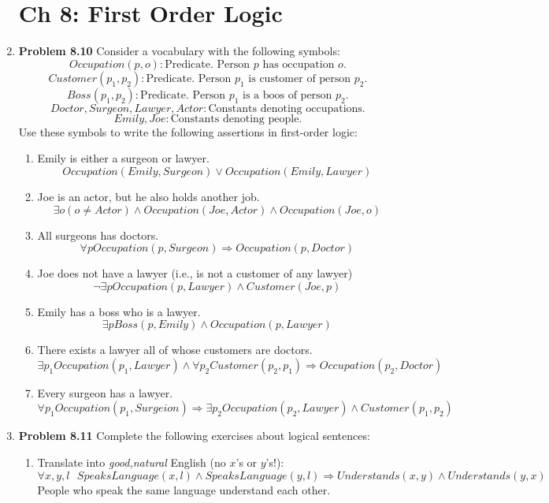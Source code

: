 \documentclass[10pt]{article}
\begin{document}
\begin{enumerate}
\section*{Ch 8: First Order Logic}
\item \textbf{Problem 8.10} Consider a vocabulary with the following symbols:
  \[Occupation(p,o): \textrm{Predicate. Person } p \textrm{ has occupation } o. \] 
  \[Customer(p_1,p_2): \textrm{Predicate. Person } p_1 \textrm{ is customer of person } p_2. \]
  \[Boss(p_1,p_2): \textrm{Predicate. Person } p_1 \textrm{ is a boos of person } p_2. \]
  \[Doctor, Surgeon, Lawyer, Actor: \textrm{Constants denoting occupations.} \]
  \[Emily, Joe: \textrm{Constants denoting people.} \]
  Use these symbols to write the following assertions in first-order logic:
  \begin{enumerate}
  \item Emily is either a surgeon or lawyer.
    \[ Occupation(Emily,Surgeon) \lor Occupation (Emily,Lawyer)\]
  \item Joe is an actor, but he also holds another job.
    \[ \exists o(o \neq Actor) \wedge Occupation(Joe,Actor) \wedge Occupation(Joe,o)\]
  \item All surgeons has doctors.
    \[ \forall p Occupation(p,Surgeon) \Rightarrow Occupation(p,Doctor) \]
  \item Joe does not have a lawyer (i.e., is not a customer of any lawyer)
    \[ \lnot\exists p Occupation(p,Lawyer) \wedge Customer(Joe,p) \]
  \item Emily has a boss who is a lawyer.
    \[ \exists p Boss(p,Emily) \wedge Occupation(p,Lawyer) \]
  \item There exists a lawyer all of whose customers are doctors.
    \[ \exists p_1 Occupation(p_1,Lawyer) \wedge \forall p_2 Customer(p_2,p_1) \Rightarrow Occupation(p_2,Doctor) \]
  \item Every surgeon has a lawyer.
    \[ \forall p_1 Occupation(p_1,Surgeion) \Rightarrow \exists p_2 Occupation(p_2,Lawyer) \wedge Customer(p_1,p_2) \]
  \end{enumerate}
\item \textbf{Problem 8.11} Complete the following exercises about logical sentences:
  \begin{enumerate}
  \item  Translate into \textit{good,natural} English (no $x$'s or $y$'s!):
    \[ \forall x,y,l \textrm{ } SpeaksLanguage(x,l) \wedge SpeaksLanguage(y,l) \Rightarrow Understands(x,y) \wedge Understands(y,x) \]
    People who speak the same language understand each other.

\end{enumerate}
\end{enumerate}
\end{document}
